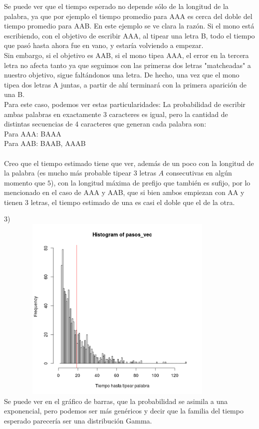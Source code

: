 \documentclass[a4paper]{article}
\begin{document}
Se puede ver que el tiempo esperado no depende sólo de la longitud de la palabra, ya que por ejemplo el tiempo promedio para AAA es cerca del doble del tiempo promedio para AAB. En este ejemplo se ve clara la razón. Si el mono está escribiendo, con el objetivo de escribir AAA, al tipear una letra B, todo el tiempo que pasó hasta ahora fue en vano, y estaría volviendo a empezar.\\
Sin embargo, si el objetivo es AAB, si el mono tipea AAA, el error en la tercera letra no afecta tanto ya que seguimos con las primeras dos letras "matcheadas" a nuestro objetivo, sigue faltándonos una letra. De hecho, una vez que el mono tipea dos letras A juntas, a partir de ahí terminará con la primera aparición de una B.\\
Para este caso, podemos ver estas particularidades: La probabilidad de escribir ambas palabras en exactamente 3 caracteres es igual, pero la cantidad de distintas secuencias de 4 caracteres que generan cada palabra son:\\
Para AAA: BAAA\\
Para AAB: BAAB, AAAB\\
\\
Creo que el tiempo estimado tiene que ver, además de un poco con la longitud de la palabra (es mucho más probable tipear $3$ letras $A$ consecutivas en algún momento que $5$), con la longitud máxima de prefijo que también es sufijo, por lo mencionado en el caso de AAA y AAB, que si bien ambos empiezan con AA y tienen $3$ letras, el tiempo estimado de una es casi el doble que el de la otra.

3)\\
\includegraphics[width=12cm,height=9cm,keepaspectratio]{histograma_BABA.png}
\\
Se puede ver en el gráfico de barras, que la probabilidad se asimila a una exponencial, pero podemos ser más genéricos y decir que la familia del tiempo esperado parecería ser una distribución Gamma.
\end{document}
